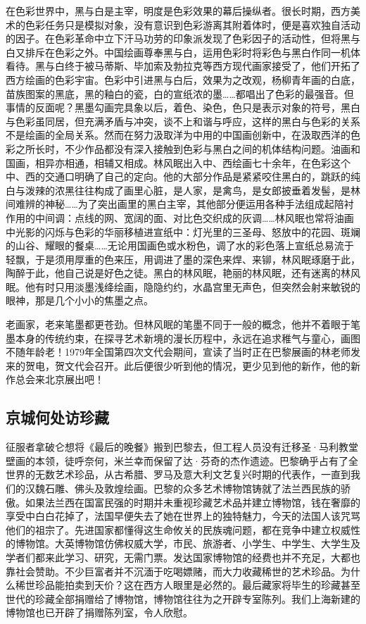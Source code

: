 \documentclass{article}
\begin{document}
在色彩世界中，黑与白是主宰，明度是色彩效果的幕后操纵者。很长时期，西方美术的色彩任务只是模拟对象，没有意识到色彩游离其附着体时，便是喜欢独自活动的因子。在色彩革命中立下汗马功劳的印象派发现了色彩因子的活动性，但将黑与白又排斥在色彩之外。中国绘画尊奉黑与白，运用色彩时将彩色与黑白作同一机体看待。黑与白终于被马蒂斯、毕加索及勃拉克等西方现代画家接受了，他们开拓了西方绘画的色彩宇宙。色彩中引进黑与白后，效果为之改观，杨柳青年画的白底，苗族图案的黑底，黑的釉白的瓷，白的宣纸浓的墨……都唱出了色彩的最强音。但事情的反面呢？黑墨勾画完具象以后，着色、染色，色只是表示对象的符号，黑白与色彩虽同居，但充满矛盾与冲突，谈不上和谐与呼应，这样的黑白与色彩的关系不是绘画的全局关系。然而在努力汲取洋为中用的中国画创新中，在汲取西洋的色彩之所长时，不少作品都没有深入接触到色彩与黑白之间的机体结构问题。油画和国画，相异亦相通，相辅又相成。林风眠出入中、西绘画七十余年，在色彩这个中、西的交通口明确了自己的定向。他的大部分作品是紧紧咬住黑白的，跳跃的纯白与泼辣的浓黑往往构成了画里心脏，是人家，是禽鸟，是女郎披垂着发髻，是林间难辨的神秘……为了突出画里的黑白主宰，其他部分便运用各种手法组成起陪衬作用的中间调：点线的网、宽阔的面、对比色交织成的灰调……林风眠也常将油画中光影的闪烁与色彩的华丽移植进宣纸中：灯光里的三圣母、怒放中的花园、斑斓的山谷、耀眼的餐桌……无论用国画色或水粉色，调了水的彩色落上宣纸总易流于轻飘，于是须用厚重的色来压，用调进了墨的深色来焊、来铆，林风眠琢磨于此，陶醉于此，他自己说是好色之徒。黑白的林风眠，艳丽的林风眠，还有迷离的林风眠。他有时只用淡墨浅绛绘画，隐隐约约，水晶宫里无声色，但突然会射来敏锐的眼神，那是几个小小的焦墨之点。

老画家，老来笔墨都更苍劲。但林风眠的笔墨不同于一般的概念，他并不着眼于笔墨本身的传统约束，在探寻艺术新境的漫长历程中，永远在追求稚气与童心，画图不随年龄老！1979年全国第四次文代会期间，宣读了当时正在巴黎展画的林老师发来的贺电，贺文代会召开。此后便很少听到他的情况，更少见到他的新作，他的新作总会来北京展出吧！
\subsection{京城何处访珍藏}
征服者拿破仑想将《最后的晚餐》搬到巴黎去，但工程人员没有迁移圣·马利教堂壁画的本领，徒呼奈何，米兰幸而保留了达·芬奇的杰作遗迹。巴黎确乎占有了全世界的无数艺术珍品，从古希腊、罗马及意大利文艺复兴时期的代表作，一直到我们的汉魏石雕、佛头及敦煌绘画。巴黎的众多艺术博物馆铸就了法兰西民族的骄傲。如果法兰西在国富民强的时期并未重视珍藏艺术品并建立博物馆，钱在奢靡的享受中白白花掉了，法国早便失去了她在世界上的独特魅力，今天的法国人该咒骂他们的祖宗了。先进国家都懂得这生命攸关的民族魂问题，都在竞争中建立权威性的博物馆。大英博物馆仿佛权威大学，市民、旅游者、小学生、中学生、大学生及学者们都来此学习、研究，无需门票。发达国家博物馆的经费也并不充足，大都也靠社会赞助。不少巨富者并不沉湎于吃喝嫖赌，而大力收藏稀世的艺术珍品。为什么稀世珍品能拍卖到天价？这在西方人眼里是必然的。最后藏家将毕生的珍藏甚至世代的珍藏全部捐赠给了博物馆，博物馆往往为之开辟专室陈列。我们上海新建的博物馆也已开辟了捐赠陈列室，令人欣慰。
\end{document}
